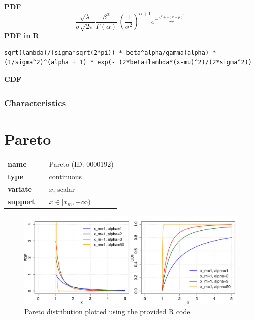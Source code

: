 \smallskip \noindent \hspace{.2cm} \textbf{PDF} 
\begin{equation*}\frac {\sqrt{\lambda}} {\sigma\sqrt{2\pi} }  \frac{\beta^\alpha}{\Gamma(\alpha)} \, \left( \frac{1}{\sigma^2} \right)^{\alpha + 1}   e^{ -\frac { 2\beta + \lambda(x - \mu)^2} {2\sigma^2}  } \end{equation*}
\smallskip \noindent \hspace{.2cm} \textbf{PDF in R}  
\begin{verbatim}sqrt(lambda)/(sigma*sqrt(2*pi)) * beta^alpha/gamma(alpha) * (1/sigma^2)^(alpha + 1) * exp(- (2*beta+lambda*(x-mu)^2)/(2*sigma^2))\end{verbatim}
\smallskip \noindent \hspace{.2cm} \textbf{CDF} 
\begin{equation*}-\end{equation*}
\smallskip
\subsubsection*{Characteristics}
\smallskip
\section*{Pareto} 

  \bigskip 

\begin{tabular}{p{2cm}cl}
\textbf{name} & & Pareto (ID: 0000192)\\ 
 
\textbf{type} & & continuous \\ 

\textbf{variate} & & $x$, scalar \\ 

\textbf{support} & & $x \in [x_m, +\infty)$
\end{tabular}

\begin{figure}[ht!]
\centering
  \includegraphics[width=140mm]{pics/Pareto.pdf}
 \caption{Pareto distribution plotted using the provided R code.}
 \label{fig:Pareto}
\end{figure}

